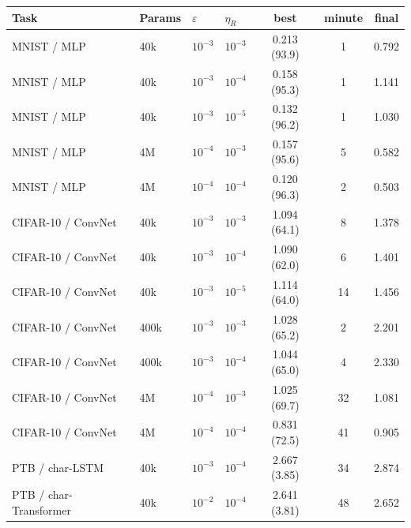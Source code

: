 \begin{tabular}{l l l l c c c}
\toprule
Task & Params & $\varepsilon$ & $\eta_R$ & best & minute & final \\
\midrule
MNIST / MLP & 40k & $10^{-3}$ & $10^{-3}$ & 0.213 (93.9) & 1 & 0.792 \\
MNIST / MLP & 40k & $10^{-3}$ & $10^{-4}$ & 0.158 (95.3) & 1 & 1.141 \\
MNIST / MLP & 40k & $10^{-3}$ & $10^{-5}$ & 0.132 (96.2) & 1 & 1.030 \\
MNIST / MLP & 4M & $10^{-4}$ & $10^{-3}$ & 0.157 (95.6) & 5 & 0.582 \\
MNIST / MLP & 4M & $10^{-4}$ & $10^{-4}$ & 0.120 (96.3) & 2 & 0.503 \\
CIFAR-10 / ConvNet & 40k & $10^{-3}$ & $10^{-3}$ & 1.094 (64.1) & 8 & 1.378 \\
CIFAR-10 / ConvNet & 40k & $10^{-3}$ & $10^{-4}$ & 1.090 (62.0) & 6 & 1.401 \\
CIFAR-10 / ConvNet & 40k & $10^{-3}$ & $10^{-5}$ & 1.114 (64.0) & 14 & 1.456 \\
CIFAR-10 / ConvNet & 400k & $10^{-3}$ & $10^{-3}$ & 1.028 (65.2) & 2 & 2.201 \\
CIFAR-10 / ConvNet & 400k & $10^{-3}$ & $10^{-4}$ & 1.044 (65.0) & 4 & 2.330 \\
CIFAR-10 / ConvNet & 4M & $10^{-4}$ & $10^{-3}$ & 1.025 (69.7) & 32 & 1.081 \\
CIFAR-10 / ConvNet & 4M & $10^{-4}$ & $10^{-4}$ & 0.831 (72.5) & 41 & 0.905 \\
PTB / char-LSTM & 40k & $10^{-3}$ & $10^{-4}$ & 2.667 (3.85) & 34 & 2.874 \\
PTB / char-Transformer & 40k & $10^{-2}$ & $10^{-4}$ & 2.641 (3.81) & 48 & 2.652 \\
\bottomrule
\end{tabular}
